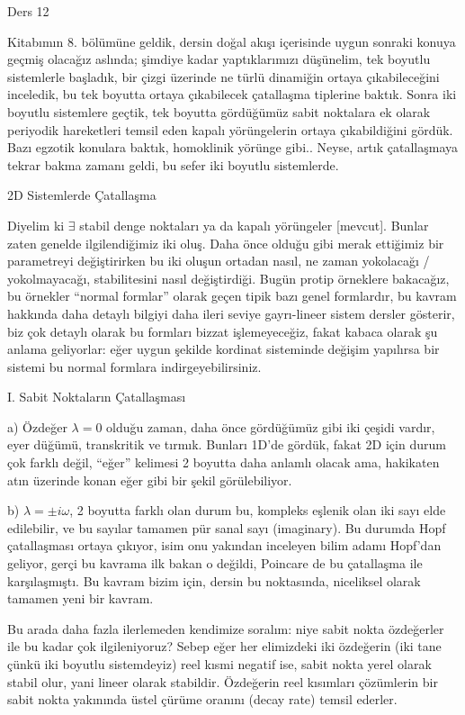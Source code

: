 \documentclass[12pt,fleqn]{article}\usepackage{../../common}
\begin{document}
Ders 12

Kitabımın 8. bölümüne geldik, dersin doğal akışı içerisinde uygun sonraki konuya
geçmiş olacağız aslında; şimdiye kadar yaptıklarımızı düşünelim, tek boyutlu
sistemlerle başladık, bir çizgi üzerinde ne türlü dinamiğin ortaya
çıkabileceğini inceledik, bu tek boyutta ortaya çıkabilecek çatallaşma tiplerine
baktık. Sonra iki boyutlu sistemlere geçtik, tek boyutta gördüğümüz sabit
noktalara ek olarak periyodik hareketleri temsil eden kapalı yörüngelerin ortaya
çıkabildiğini gördük. Bazı egzotik konulara baktık, homoklinik yörünge
gibi.. Neyse, artık çatallaşmaya tekrar bakma zamanı geldi, bu sefer iki boyutlu
sistemlerde.

2D Sistemlerde Çatallaşma

Diyelim ki $\exists$ stabil denge noktaları ya da kapalı yörüngeler
[mevcut]. Bunlar zaten genelde ilgilendiğimiz iki oluş. Daha önce olduğu gibi
merak ettiğimiz bir parametreyi değiştirirken bu iki oluşun ortadan nasıl, ne
zaman yokolacağı / yokolmayacağı, stabilitesini nasıl değiştirdiği. Bugün protip
örneklere bakacağız, bu örnekler ``normal formlar'' olarak geçen tipik bazı
genel formlardır, bu kavram hakkında daha detaylı bilgiyi daha ileri seviye
gayrı-lineer sistem dersler gösterir, biz çok detaylı olarak bu formları bizzat
işlemeyeceğiz, fakat kabaca olarak şu anlama geliyorlar: eğer uygun şekilde
kordinat sisteminde değişim yapılırsa bir sistemi bu normal formlara
indirgeyebilirsiniz.

I. Sabit Noktaların Çatallaşması

a) Özdeğer $\lambda = 0$ olduğu zaman, daha önce gördüğümüz gibi iki çeşidi
vardır, eyer düğümü, transkritik ve tırmık. Bunları 1D'de gördük, fakat 2D için
durum çok farklı değil, ``eğer'' kelimesi 2 boyutta daha anlamlı olacak ama,
hakikaten atın üzerinde konan eğer gibi bir şekil görülebiliyor.

b) $\lambda = \pm i\omega$, 2 boyutta farklı olan durum bu, kompleks eşlenik
olan iki sayı elde edilebilir, ve bu sayılar tamamen pür sanal sayı
(imaginary). Bu durumda Hopf çatallaşması ortaya çıkıyor, isim onu yakından
inceleyen bilim adamı Hopf'dan geliyor, gerçi bu kavrama ilk bakan o değildi,
Poincare de bu çatallaşma ile karşılaşmıştı. Bu kavram bizim için, dersin bu
noktasında, niceliksel olarak tamamen yeni bir kavram.

Bu arada daha fazla ilerlemeden kendimize soralım: niye sabit nokta özdeğerler
ile bu kadar çok ilgileniyoruz? Sebep eğer her elimizdeki iki özdeğerin (iki
tane çünkü iki boyutlu sistemdeyiz) reel kısmi negatif ise, sabit nokta yerel
olarak stabil olur, yani lineer olarak stabildir. Özdeğerin reel kısımları
çözümlerin bir sabit nokta yakınında üstel çürüme oranını (decay rate) temsil
ederler.
\end{document}
